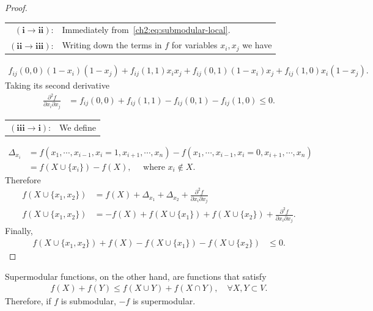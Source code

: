 	\begin{proof}
	
	\begin{tabular}{rl}
	$\mathbf{(i\rightarrow ii)}$:& Immediately from~\cref{ch2:eq:submodular-local}. \\	
	$\mathbf{(ii\rightarrow iii)}$:&  Writing down the terms in $f$ for variables $x_i,x_j$ we have
	\end{tabular}
	\begin{align*}
		f_{ij}(0,0)(1-x_i)(1-x_j) + f_{ij}(1,1)x_ix_j + f_{ij}(0,1)(1-x_i)x_j + f_{ij}(1,0)x_i(1-x_j).
	\end{align*}
%
	Taking its second derivative
	\begin{align*}
		\frac{\partial^2f}{\partial x_i\partial x_j} &= f_{ij}(0,0) + f_{ij}(1,1) - f_{ij}(0,1) - f_{ij}(1,0) \leq 0.
	\end{align*}
%	
	\begin{tabular}{rl}
		$\mathbf{(iii\rightarrow i)}$:& We define
	\end{tabular}		
		\begin{align*}
			\Delta_{x_i} &= f(x_1,\cdots,x_{i-1},x_i=1,x_{i+1},\cdots,x_n) - f(x_1,\cdots,x_{i-1},x_i=0,x_{i+1},\cdots,x_n) \\
			&= f(X \cup \{x_i\}) - f(X), \quad \text{ where } x_i \notin X.
		\end{align*}		 		
		Therefore
		\begin{align*}
			f( X \cup \{x_1,x_2\}) &= f(X) + \Delta_{x_1} + \Delta_{x_2} + \frac{ \partial^2 f}{\partial x_i \partial x_j} \\
			f( X \cup \{x_1,x_2\}) &= -f(X) + f(X \cup \{x_1\}) + f(X \cup \{x_2\}) + \frac{ \partial^2 f}{\partial x_i \partial x_j}.
		\end{align*}	
%		
		Finally,
		\begin{align*}
			f( X \cup \{x_1,x_2\}) +f(X) - f(X \cup \{x_1\}) - f(X \cup \{x_2\}) &\leq 0.	
		\end{align*}
%		
	\end{proof}

Supermodular functions, on the other hand, are functions that satisfy
\begin{align*}
	f(X) + f(Y) \leq f(X \cup Y) + f(X \cap Y),\quad \forall X,Y \subset V.
\end{align*}
%
Therefore, if $f$ is submodular, $-f$ is supermodular. 

